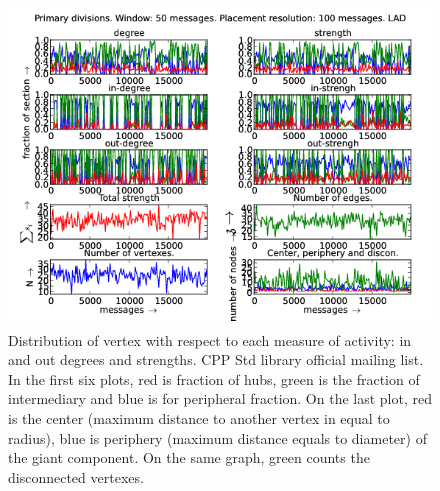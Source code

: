\documentclass[%
 aip,
 jmp,%
 amsmath,amssymb,
 reprint,%
]{revtex4-1}
\begin{document}
\begin{figure}[hbtp] 
   \centering
        \includegraphics[width=\textwidth]{figs/LAD/50}
    \caption{Distribution of vertex with respect to each measure of activity: in and out degrees and strengths. CPP Std library official mailing list. In the first six plots, red is fraction of hubs, green is the fraction of intermediary and blue is for peripheral fraction. On the last plot, red is the center (maximum distance to another vertex in equal to radius), blue is periphery (maximum distance equals to diameter) of the giant component. On the same graph, green counts the disconnected vertexes.}
    \label{fig:lad50}
\end{figure}
\end{document}
